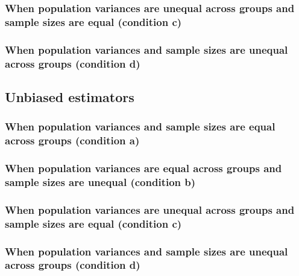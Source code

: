 \documentclass[
  man]{apa6}
\begin{document}
\hypertarget{when-population-variances-are-unequal-across-groups-and-sample-sizes-are-equal-condition-c}{%
\subsubsection{When population variances are unequal across groups and sample sizes are equal (condition c)}\label{when-population-variances-are-unequal-across-groups-and-sample-sizes-are-equal-condition-c}}

\hypertarget{when-population-variances-and-sample-sizes-are-unequal-across-groups-condition-d}{%
\subsubsection{When population variances and sample sizes are unequal across groups (condition d)}\label{when-population-variances-and-sample-sizes-are-unequal-across-groups-condition-d}}

\newpage
\begin{landscape}

\end{landscape}

\hypertarget{unbiased-estimators}{%
\subsection{Unbiased estimators}\label{unbiased-estimators}}

\hypertarget{when-population-variances-and-sample-sizes-are-equal-across-groups-condition-a}{%
\subsubsection{When population variances and sample sizes are equal across groups (condition a)}\label{when-population-variances-and-sample-sizes-are-equal-across-groups-condition-a}}

\hypertarget{when-population-variances-are-equal-across-groups-and-sample-sizes-are-unequal-condition-b-1}{%
\subsubsection{When population variances are equal across groups and sample sizes are unequal (condition b)}\label{when-population-variances-are-equal-across-groups-and-sample-sizes-are-unequal-condition-b-1}}

\hypertarget{when-population-variances-are-unequal-across-groups-and-sample-sizes-are-equal-condition-c-1}{%
\subsubsection{When population variances are unequal across groups and sample sizes are equal (condition c)}\label{when-population-variances-are-unequal-across-groups-and-sample-sizes-are-equal-condition-c-1}}

\hypertarget{when-population-variances-and-sample-sizes-are-unequal-across-groups-condition-d-1}{%
\subsubsection{When population variances and sample sizes are unequal across groups (condition d)}\label{when-population-variances-and-sample-sizes-are-unequal-across-groups-condition-d-1}}
\end{document}
